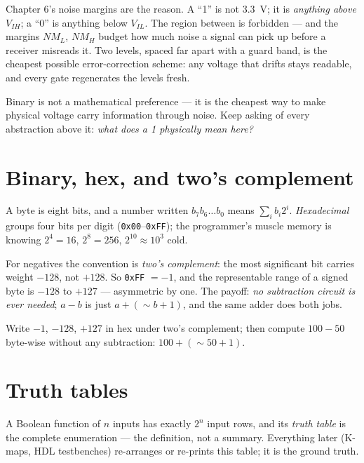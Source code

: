 Chapter 6's noise margins are the reason. A ``1'' is not
\qty{3.3}{\volt}; it is \emph{anything above} $V_{IH}$; a ``0'' is
anything below $V_{IL}$. The region between is forbidden — and the
margins $NM_L$, $NM_H$ budget how much noise a signal can pick up before
a receiver misreads it. Two levels, spaced far apart with a guard band,
is the cheapest possible error-correction scheme: any voltage that
drifts stays readable, and every gate regenerates the levels fresh.

\begin{checkpoint}
Binary is not a mathematical preference — it is the cheapest way to make
physical voltage carry information through noise. Keep asking of every
abstraction above it: \emph{what does a 1 physically mean here?}
\end{checkpoint}

\section{Binary, hex, and two's complement}
\label{sec:repr}

A byte is eight bits, and a number written $b_7b_6\ldots b_0$ means
$\sum_i b_i 2^i$. \emph{Hexadecimal} groups four bits
per digit (\texttt{0x00}--\texttt{0xFF}); the programmer's muscle memory
is knowing $2^4=16$, $2^8=256$, $2^{10}\approx10^{3}$ cold.

For negatives the convention is \emph{two's
complement}: the most significant bit carries
weight $-128$, not $+128$. So \texttt{0xFF} $= -1$, and the representable
range of a signed byte is $-128$ to $+127$ — asymmetric by one. The
payoff: \emph{no subtraction circuit is ever needed}; $a-b$ is just
$a+(\sim b + 1)$, and the same adder does both jobs.

\begin{exercise}[easy]
Write $-1$, $-128$, $+127$ in hex under two's complement; then compute
$100 - 50$ byte-wise without any subtraction: $100 + (\sim50 + 1)$.
\end{exercise}

\section{Truth tables}
\label{sec:tt}

A Boolean function of $n$ inputs has exactly $2^n$ input rows, and its
\emph{truth table} is the complete enumeration — the
definition, not a summary. Everything later (K-maps, HDL testbenches)
re-arranges or re-prints this table; it is the ground truth.

